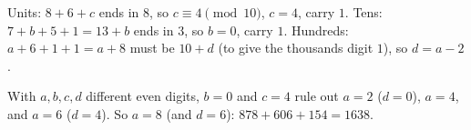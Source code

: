 Units: $8+6+c$ ends in $8$, so $c\equiv4\pmod{10}$, $c=4$, carry $1$. Tens: $7+b+5+1=13+b$ ends in $3$, so $b=0$, carry $1$. Hundreds: $a+6+1+1=a+8$ must be $10+d$ (to give the thousands digit $1$), so $d=a-2$.

With $a,b,c,d$ different even digits, $b=0$ and $c=4$ rule out $a=2$ ($d=0$), $a=4$, and $a=6$ ($d=4$). So $a=\boxed{8}$ (and $d=6$): $878+606+154=1638$.
